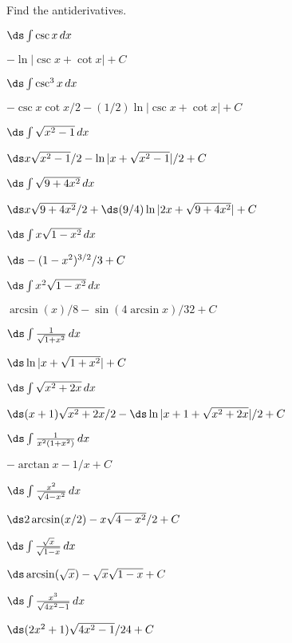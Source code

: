 \begin{exercises}

Find the antiderivatives.

\twocol

\exercise $\ds\int\csc x\,dx$
\begin{answer} $-\ln|\csc x+\cot x|+C$
\end{answer}

\exercise $\ds\int\csc^3 x\,dx$
\begin{answer} $-\csc x\cot x/2-(1/2)\ln|\csc x+\cot x|+C$
\end{answer}

\exercise $\ds\int\sqrt{x^2-1}\,dx$
\begin{answer} $\ds x\sqrt{x^2-1}/2-\ln|x+\sqrt{x^2-1}|/2+C$
\end{answer}

\exercise $\ds\int\sqrt{9+4x^2}\,dx$
\begin{answer} $\ds x\sqrt{9+4x^2}/2+\hbox{$\ds(9/4)\ln|2x+\sqrt{9+4x^2}|+C$}$
\end{answer}

\exercise $\ds\int x\sqrt{1-x^2}\,dx$
\begin{answer} $\ds -(1-x^2)^{3/2}/3+C$
\end{answer}

\exercise $\ds\int x^2\sqrt{1-x^2}\,dx$
\begin{answer} $\arcsin(x)/8-\sin(4\arcsin x)/32+C$
\end{answer}

\exercise $\ds\int{1\over\sqrt{1+x^2}}\,dx$
\begin{answer} $\ds \ln|x+\sqrt{1+x^2}|+C$
\end{answer}

\exercise $\ds\int\sqrt{x^2+2x}\,dx$
\begin{answer} $\ds (x+1)\sqrt{x^2+2x}/2-\hbox{$\ds\ln|x+1+\sqrt{x^2+2x}|/2+C$}$
\end{answer}

\exercise $\ds\int{1\over x^2(1+x^2)}\,dx$
\begin{answer} $-\arctan x - 1/x+C$
\end{answer}

\exercise $\ds\int{x^2\over\sqrt{4-x^2}}\,dx$
\begin{answer} $\ds 2\arcsin(x/2)-x\sqrt{4-x^2}/2+C$
\end{answer}

\exercise $\ds\int{\sqrt{x}\over\sqrt{1-x}}\,dx$
\begin{answer} $\ds \arcsin(\sqrt{x})-\sqrt{x}\sqrt{1-x}+C$
\end{answer}

\exercise $\ds\int{x^3\over\sqrt{4x^2-1}}\,dx$
\begin{answer} $\ds (2x^2+1)\sqrt{4x^2-1}/24+C$
\end{answer}

\endtwocol

\end{exercises}

